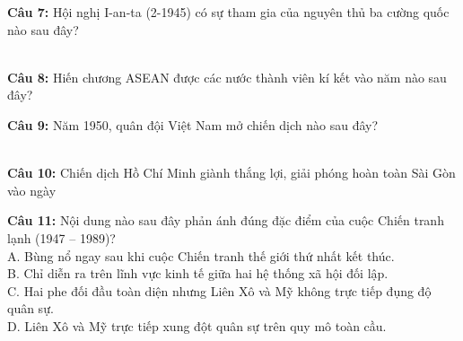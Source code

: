 \documentclass[12pt,a4paper]{article}
\begin{document}
\noindent \textbf{Câu 7:} Hội nghị I-an-ta (2-1945) có sự tham gia của nguyên thủ ba cường quốc nào sau đây?\\
\noindent{}\\
\noindent{}

\noindent \textbf{Câu 8:} Hiến chương ASEAN được các nước thành viên kí kết vào năm nào sau đây?\\
\noindent{}

\noindent \textbf{Câu 9:} Năm 1950, quân đội Việt Nam mở chiến dịch nào sau đây?\\
\noindent{}\\
\noindent{}

\noindent \textbf{Câu 10:} Chiến dịch Hồ Chí Minh giành thắng lợi, giải phóng hoàn toàn Sài Gòn vào ngày\\
\noindent{}

\noindent \textbf{Câu 11:} Nội dung nào sau đây phản ánh đúng đặc điểm của cuộc Chiến tranh lạnh (1947 -- 1989)?\\
\noindent A. Bùng nổ ngay sau khi cuộc Chiến tranh thế giới thứ nhất kết thúc.\\
\noindent B. Chỉ diễn ra trên lĩnh vực kinh tế giữa hai hệ thống xã hội đối lập.\\
\noindent C. Hai phe đối đầu toàn diện nhưng Liên Xô và Mỹ không trực tiếp đụng độ quân sự.\\
\noindent D. Liên Xô và Mỹ trực tiếp xung đột quân sự trên quy mô toàn cầu.
\end{document}
